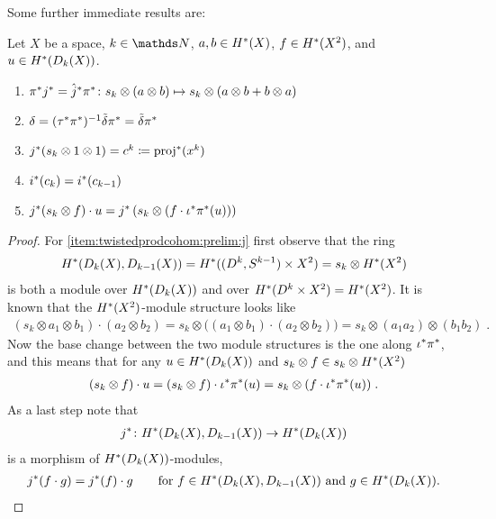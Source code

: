 Some further immediate results are:
\begin{Cor}\label{cor:twistedprodcohom:prelim}
  Let $X$ be a space, $k\in\Nat$,
  $a,b\in H^*(X)$, $f\in H^*(X^2)$, and
  $u\in H^*(D_{k}({X}))$.
  \begin{enumerate}
  \item\label{item:twistedprodcohom:prelim:pij} 
    ${\pi}^*{j}^*
    = {\hat j}^*{\pi}^*\colon
    s_k\otimes(a\otimes b)\mapsto s_k\otimes(a\otimes b+b\otimes a)$
  \item $\delta = ({\tau}^*{\pi}^*)^{-1}\tilde\delta{\pi}^* = \tilde\delta{\pi}^*$
  \item ${j}^*(s_k\otimes 1\otimes 1) = c^k \coloneqq {\mathrm{proj}}^*(x^k)$
  \item ${i}^*(c_k) = {i}^*(c_{k-1})$
  \item\label{item:twistedprodcohom:prelim:j}
    ${j}^*(s_k\otimes f)\cdot u
    = {j}^*\left(s_k\otimes(f\cdot {\iota}^*{\pi}^*(u))\right)$
  \end{enumerate}
  \begin{proof}
    For \ref{item:twistedprodcohom:prelim:j} first observe that the
    ring
    \begin{gather*}
      H^*(D_{k}({X}), D_{k-1}({X}))
      = H^*((D^{k},S^{k-1})\times X^2)
      = s_k\otimes H^*(X^2)
    \end{gather*}
    is both a module over $H^*(D_{k}({X}))$ and over
    $H^*(D^{k}\times X^2)=H^*(X^2)$. It is known that the
    $H^*(X^2)$-module structure looks like
    \begin{gather*}
      (s_k\otimes a_1\otimes b_1)\cdot (a_2\otimes b_2)
      = s_k\otimes\big((a_1\otimes b_1)\cdot(a_2\otimes b_2)\big)
      = s_k\otimes(a_1a_2)\otimes(b_1b_2)
      \;.
    \end{gather*}
    Now the base change between the two module structures is the one
    along ${\iota}^*{\pi}^*$, and this means that
    for any $u\in H^*(D_{k}({X}))$
    and
    $s_k\otimes f \in s_k\otimes H^*(X^2)$
    \begin{gather*}
      (s_k\otimes f)\cdot u
      = (s_k\otimes f)\cdot{\iota}^*{\pi}^*(u)
      = s_k\otimes(f\cdot {\iota}^*{\pi}^*(u))
      \;.
    \end{gather*}
    As a last step note that
    \begin{gather*}
      {j}^*\colon
      H^*(D_{k}({X}), D_{k-1}({X}))
      \to H^*(D_{k}({X}))
    \end{gather*}
    is a morphism of $H^*(D_{k}({X}))$-modules, \idest
    \begin{gather*}
      {j}^*(f\cdot g) = {j}^*(f)\cdot g
      \qquad\text{for
        $f\in H^*(D_{k}({X}), D_{k-1}({X}))$ and
        $g\in H^*(D_{k}({X}))$.}
      \qedhere
    \end{gather*}
  \end{proof}
\end{Cor}

